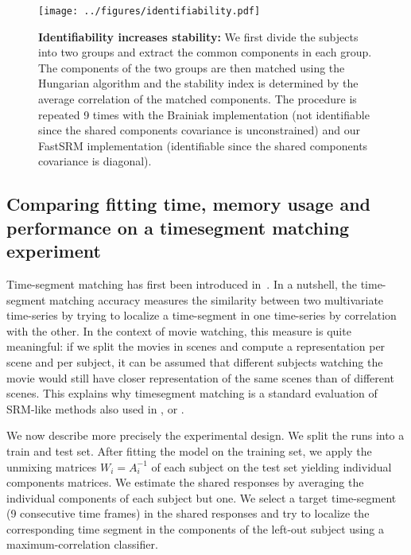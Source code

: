 \documentclass{article}
\begin{document}
\begin{figure}
\begin{minipage}{0.38\linewidth}
      \texttt{[image: ../figures/identifiability.pdf]}
    \end{minipage}
    \hfill
    \begin{minipage}{0.6\linewidth}
        \caption{\label{exp:identifiability}\textbf{Identifiability increases
            stability: } We first divide the subjects
          into two groups and extract the common components in each group.
          The components of the two groups are then matched using the Hungarian
          algorithm and the stability index is determined by the average
          correlation of the matched components.
          The procedure is repeated 9 times with the Brainiak implementation
          (not identifiable since the shared components covariance is unconstrained) and our FastSRM implementation
          (identifiable since the shared components covariance is diagonal).
        }
    \end{minipage}
\end{figure}


\subsection{Comparing fitting time, memory usage and performance on a
  timesegment matching experiment}
\label{sec:timesegment_expe}
\label{timesegment_expe}
Time-segment matching has first been introduced
in~\cite{chen2015reduced}.
%
In a nutshell, the time-segment matching accuracy measures the similarity
between two multivariate time-series by trying to localize a time-segment in one
time-series by correlation with the other.
%
In the context of movie watching, this measure is quite meaningful: if
we split the movies in scenes and compute a representation per scene
and per subject, it can be assumed that different subjects watching
the movie would still have closer representation of the same scenes
than of different scenes.
%
This explains why timesegment matching is a standard evaluation of SRM-like methods also used in  \cite{guntupalli2018computational}, \cite{Nastase741975} or
\cite{zhang2016searchlight}.
%


We now describe more precisely the experimental design.
%
We split the runs into a train and test set.
%
After fitting the model on the
training set, we apply the unmixing matrices $W_i=A_i^{-1}$ of each subject on
the test set yielding individual components matrices.
%
We estimate the shared responses by averaging the individual components of each
subject but one.
%
We select a target time-segment (9 consecutive time frames) in the shared
responses and try to localize the corresponding time segment in the components
of the left-out subject using a maximum-correlation classifier.
%
\end{document}
